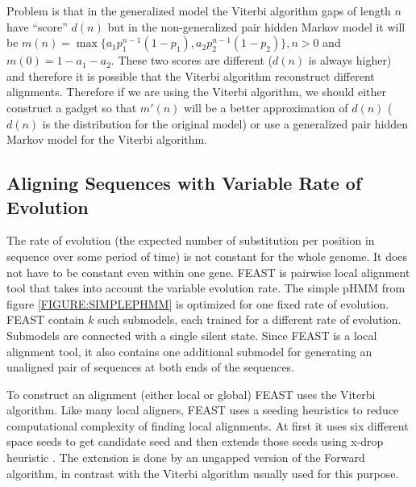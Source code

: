 Problem is that in the generalized model the Viterbi algorithm gaps of length
$n$ have ``score'' $d(n)$ but in the non-generalized pair hidden Markov model it
will be $m(n)=\max\{a_1p_1^{n-1}(1-p_1),a_2p_2^{n-1}(1-p_2)\}, n>0$ and
$m(0)=1-a_1-a_2$.  These two scores are different ($d(n)$ is always higher) and
therefore it is possible that the Viterbi algorithm reconstruct different
alignments. Therefore if we are using the Viterbi algorithm, we should either
construct a gadget so that $m'(n)$ will be a better approximation of $d(n)$
($d(n)$ is the distribution for the original model) or use a generalized pair
hidden Markov model for the Viterbi algorithm.


\subsection{Aligning Sequences with Variable Rate of Evolution}
\label{SECTION:FEAST} 

The rate of evolution (the expected number of substitution per position in
sequence over some period of time) is not constant for the whole genome. It does
not have to be constant even within one gene. FEAST is pairwise local alignment
tool \cite{FEAST2011} that takes into account the variable evolution rate. The
simple pHMM from figure \ref{FIGURE:SIMPLEPHMM} is optimized for one fixed rate
of evolution.  FEAST contain $k$ such submodels, each trained for a different
rate of evolution.  Submodels are connected with a single silent state.  Since
FEAST is a local alignment tool, it also contains one additional submodel for
generating an unaligned pair of  sequences  at both ends of the sequences.

To construct an alignment (either local or global) FEAST uses the Viterbi
algorithm. Like many local aligners, FEAST uses a seeding heuristics to reduce
computational complexity of finding local alignments.  At first it uses six
different space seeds to get candidate seed and then extends those seeds using
x-drop heuristic \cite{Altschul1997}. The extension is done by an ungapped
version of the Forward algorithm, in contrast with the Viterbi algorithm usually
used for this purpose. 

